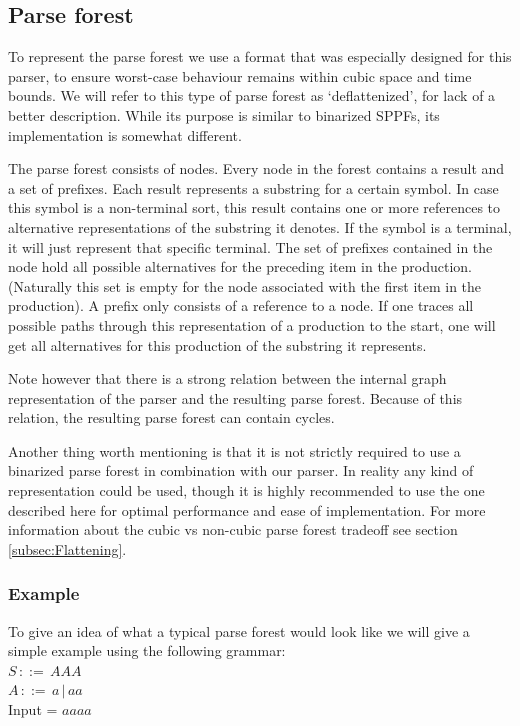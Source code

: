 \documentclass[a4paper,10pt]{article}
\begin{document}
\subsection{Parse forest}

To represent the parse forest we use a format that was especially designed for this parser, to ensure worst-case behaviour remains within cubic space and time bounds. We will refer to this type of parse forest as `deflattenized', for lack of a better description. While its purpose is similar to binarized SPPFs, its implementation is somewhat different.

The parse forest consists of nodes. Every node in the forest contains a result and a set of prefixes. Each result represents a substring for a certain symbol. In case this symbol is a non-terminal sort, this result contains one or more references to alternative representations of the substring it denotes. If the symbol is a terminal, it will just represent that specific terminal. The set of prefixes contained in the node hold all possible alternatives for the preceding item in the production. (Naturally this set is empty for the node associated with the first item in the production). A prefix only consists of a reference to a node. If one traces all possible paths through this representation of a production to the start, one will get all alternatives for this production of the substring it represents.

Note however that there is a strong relation between the internal graph representation of the parser and the resulting parse forest. Because of this relation, the resulting parse forest can contain cycles.

Another thing worth mentioning is that it is not strictly required to use a binarized parse forest in combination with our parser. In reality any kind of representation could be used, though it is highly recommended to use the one described here for optimal performance and ease of implementation. For more information about the cubic vs non-cubic parse forest tradeoff see section \ref{subsec:Flattening}.

\subsubsection{Example}
To give an idea of what a typical parse forest would look like we will give a simple example using the following grammar:\\
$S\,::=\,AAA$\\
$A\,::=\,a\,|\,aa$\\
Input = $aaaa$
\end{document}
